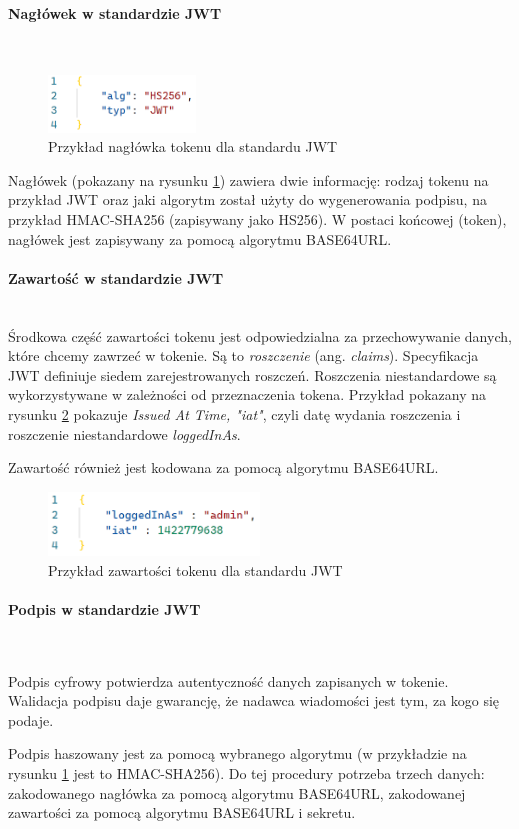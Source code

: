 \documentclass[12pt]{article}
\newcommand{\myparagraph}[1]{\paragraph{#1}\mbox{}\\}
\numberwithin{figure}{section}
\begin{document}
\begin{sloppypar}
    \myparagraph{Nagłówek w standardzie JWT}
    \begin{figure}[H] 
     	\centering
    	\includegraphics[width=0.35\textwidth]{images/chapter_3/jwt-header.png}
    	\caption{Przykład nagłówka tokenu dla standardu JWT}
    	\label{fig:jwt-header}
    \end{figure}
    
    Nagłówek (pokazany na rysunku \ref{fig:jwt-header}) zawiera dwie informację: rodzaj tokenu na przykład JWT oraz jaki algorytm został użyty do wygenerowania podpisu, na przykład HMAC-SHA256 (zapisywany jako HS256). W postaci końcowej (token), nagłówek jest zapisywany za pomocą algorytmu BASE64URL.
    
    \myparagraph{Zawartość w standardzie JWT}
    Środkowa część zawartości tokenu jest odpowiedzialna za przechowywanie danych, które chcemy zawrzeć w tokenie. Są to \textit{roszczenie} (ang. \textit{claims}). Specyfikacja JWT definiuje siedem zarejestrowanych roszczeń. Roszczenia niestandardowe są wykorzystywane w zależności od przeznaczenia tokena.
    Przykład pokazany na rysunku \ref{fig:jwt-payload} pokazuje \textit{Issued At Time, "iat"}, czyli datę wydania roszczenia i roszczenie niestandardowe \textit{loggedInAs}.
    
    Zawartość również jest kodowana za pomocą algorytmu BASE64URL.
    \begin{figure}[H] 
     	\centering
    	\includegraphics[width=0.5\textwidth]{images/chapter_3/jwt-payload.png}
    	\caption{Przykład zawartości tokenu dla standardu JWT}
    	\label{fig:jwt-payload}
    \end{figure}
    
    \myparagraph{Podpis w standardzie JWT}
    \label{signature}
    
    Podpis cyfrowy potwierdza autentyczność danych zapisanych w tokenie. Walidacja podpisu daje gwarancję, że nadawca wiadomości jest tym, za kogo się podaje.
    
    Podpis haszowany jest za pomocą wybranego algorytmu (w przykładzie na rysunku \ref{fig:jwt-header} jest to HMAC-SHA256). Do tej procedury potrzeba trzech danych: zakodowanego nagłówka za pomocą algorytmu BASE64URL, zakodowanej zawartości za pomocą algorytmu BASE64URL i sekretu. 
    

\end{sloppypar}
\end{document}
